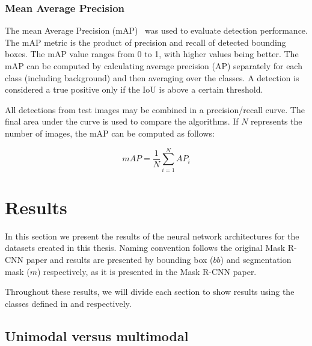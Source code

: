 \documentclass[oneside, english, bibtex]{kththesis}
\begin{document}
\subsection{Mean Average Precision}

The mean Average Precision (mAP)~\cite{zhang2009average} was used to evaluate detection performance. The mAP metric is the product of precision and recall of detected bounding boxes. The mAP value ranges from 0 to 1, with higher values being better. The mAP can be computed by calculating average precision (AP) separately for each class (including background) and then averaging over the classes. A detection is considered a true positive only if the IoU is above a certain threshold.

All detections from test images may be combined in a precision/recall curve. The final area under the curve is used to compare the algorithms. If $N$ represents the number of images, the mAP can be computed as follows:

\begin{equation}
mAP = \frac{1}{N} \sum_{i=1}^{N} AP_i
    \label{eqn:map}
\end{equation}


\chapter{Results}
\label{ch:results}

In this section we present the results of the neural network architectures for the datasets created in this thesis. Naming convention follows the original Mask R-CNN paper and results are presented by bounding box ($bb$) and segmentation mask ($m$) respectively, as it is presented in the Mask R-CNN paper.

Throughout these results, we will divide each section to show results using the classes defined in  and  respectively.

\section{Unimodal versus multimodal}
\end{document}
